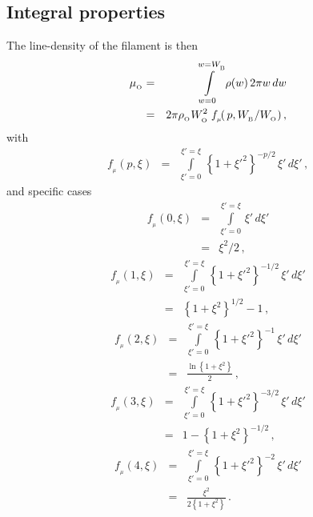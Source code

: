 \documentclass[usenatbib]{mn2e}
\newcommand{\subB}{_{_{\rm B}}}
\newcommand{\subO}{_{_{\rm O}}}
\numberwithin{equation}{section}
\begin{document}
\subsection{Integral properties}

The line-density of the filament is then 
\begin{eqnarray}\nonumber
\mu\subO&=&\int\limits_{w=0}^{w=W\subB}\rho(w)\,2\pi w\,dw\\\label{EQN:muFIL}
&=&2\pi\rho\subO W\subO^2\;f_{_\mu}\!(\,p,W\subB/W\subO)\,,
\end{eqnarray}
with
\begin{eqnarray}
f_{_\mu}\!(p,\xi)&=&\int\limits_{\xi'=0}^{\xi'=\xi}\,\left\{1+\xi'^2\right\}^{-p/2}\,\xi'\,d\xi'\,,
\end{eqnarray}
and specific cases
\begin{eqnarray}\nonumber
f_{_\mu}(0,\xi)&=&\int\limits_{\xi'=0}^{\xi'=\xi}\,\xi'\,d\xi'\\
&=&\xi^2/2\,,
\end{eqnarray}
\begin{eqnarray}\nonumber
f_{_\mu}(1,\xi)\!&\!=\!&\!\int\limits_{\xi'=0}^{\xi'=\xi}\,\left\{1+\xi'^2\right\}^{-1/2}\,\xi'\,d\xi'\\
&=&\left\{1+\xi^2\right\}^{1/2}-1\,,
\end{eqnarray}
\begin{eqnarray}\nonumber
f_{_\mu}(2,\xi)\!&\!=\!&\!\int\limits_{\xi'=0}^{\xi'=\xi}\,\left\{1+\xi'^2\right\}^{-1}\,\xi'\,d\xi'\\
&=&\frac{\ln\left\{1+\xi^2\right\}}{2}\,,
\end{eqnarray}
\begin{eqnarray}\nonumber
f_{_\mu}(3,\xi)\!&\!=\!&\!\int\limits_{\xi'=0}^{\xi'=\xi}\,\left\{1+\xi'^2\right\}^{-3/2}\,\xi'\,d\xi'\\
&=&1-\left\{1+\xi^2\right\}^{-1/2}\,,
\end{eqnarray}
\begin{eqnarray}\nonumber
f_{_\mu}(4,\xi)\!&\!=\!&\!\int\limits_{\xi'=0}^{\xi'=\xi}\,\left\{1+\xi'^2\right\}^{-2}\,\xi'\,d\xi'\\
&=&\frac{\xi^2}{2\left\{1+\xi^2\right\}}\,.
\end{eqnarray}
\end{document}
